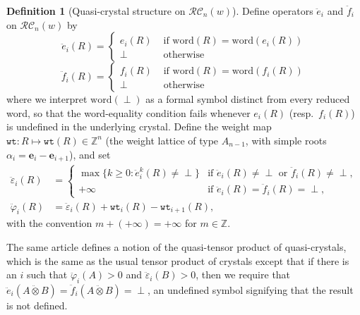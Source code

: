 \documentclass[a4paper,fleqn]{cas-sc}
\theoremstyle{definition}
\newtheorem{definition}[lemma]{Definition}
\theoremstyle{remark}
\numberwithin{equation}{subsection}
\newcommand{\wtt}{\mathtt{wt}}
\newcommand{\RC}{\mathcal{RC}}
\begin{document}
\begin{definition}[Quasi-crystal structure on $\RC_n(w)$]\label{definition:quasicrystal}
Define operators $\ddot{e}_i$ and $\ddot{f}_i$ on $\RC_n(w)$ by
$$\ddot{e}_i(R) = \begin{cases}
  e_i(R) & \text{ if }\mathrm{word}(R) = \mathrm{word}(e_i(R))\\
  \perp & \text{ otherwise}
\end{cases}$$
$$\ddot{f}_i(R) = \begin{cases}
  f_i(R) & \text{ if }\mathrm{word}(R) = \mathrm{word}(f_i(R))\\
  \perp & \text{ otherwise}
\end{cases}$$
where we interpret $\mathrm{word}(\perp)$ as a formal symbol distinct from every reduced word, so that the word-equality condition fails whenever $e_i(R)$ (resp.\ $f_i(R)$) is undefined in the underlying crystal. Define the weight map $\wtt:R\mapsto\wtt(R)\in\mathbb{Z}^n$ (the weight lattice of type $A_{n-1}$, with simple roots $\alpha_i=\mathbf{e}_i-\mathbf{e}_{i+1}$), and set
\begin{align*}
\ddot{\varepsilon}_i(R) &= \begin{cases}\max\{k\geq 0:\ddot{e}_i^k(R)\neq\perp\}&\text{if }\ddot{e}_i(R)\neq\perp\text{ or }\ddot{f}_i(R)\neq\perp,\\ +\infty &\text{if }\ddot{e}_i(R)=\ddot{f}_i(R)=\perp,\end{cases}\\
\ddot{\varphi}_i(R) &= \ddot{\varepsilon}_i(R) + \wtt_i(R)-\wtt_{i+1}(R),
\end{align*}
with the convention $m+(+\infty)=+\infty$ for $m\in\mathbb{Z}$.

The same article \cite{cain2023quasicrystals} defines a notion of the quasi-tensor product of quasi-crystals, which is the same as the usual tensor product of crystals except that if there is an $i$ such that $\ddot{\varphi}_i(A)>0$ and $\ddot{\varepsilon}_i(B)>0$, then we require that $\ddot{e}_i(A\ddot{\otimes} B) =\ddot{f}_i(A\ddot{\otimes} B)= \perp$, an undefined symbol signifying that the result is not defined.
\end{definition}
\end{document}
